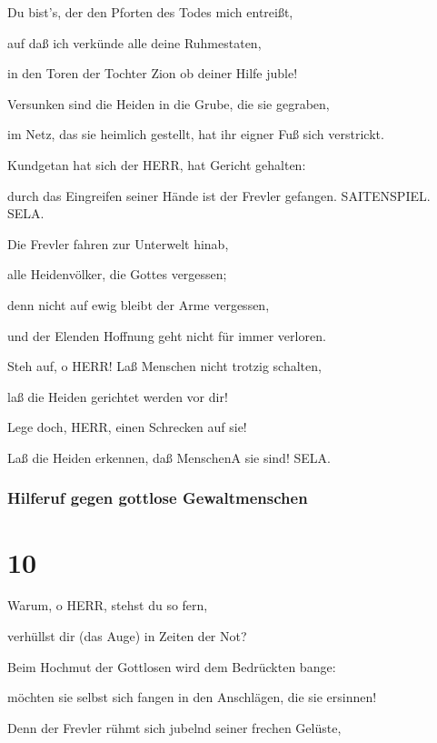 Du bist's, der den Pforten des Todes mich entreißt,

auf daß ich verkünde alle deine Ruhmestaten,

in den Toren der Tochter Zion ob deiner Hilfe juble!

Versunken sind die Heiden in die Grube, die sie gegraben,

im Netz, das sie heimlich gestellt, hat ihr eigner Fuß sich verstrickt.

Kundgetan hat sich der HERR, hat Gericht gehalten:

durch das Eingreifen seiner Hände ist der Frevler gefangen. SAITENSPIEL.
SELA.

Die Frevler fahren zur Unterwelt hinab,

alle Heidenvölker, die Gottes vergessen;

denn nicht auf ewig bleibt der Arme vergessen,

und der Elenden Hoffnung geht nicht für immer verloren.

Steh auf, o HERR! Laß Menschen nicht trotzig schalten,

laß die Heiden gerichtet werden vor dir!

Lege doch, HERR, einen Schrecken auf sie!

Laß die Heiden erkennen, daß Menschen{A} sie sind! SELA.

\hypertarget{hilferuf-gegen-gottlose-gewaltmenschen}{%
\subsubsection{Hilferuf gegen gottlose
Gewaltmenschen}\label{hilferuf-gegen-gottlose-gewaltmenschen}}

\hypertarget{section-9}{%
\section{10}\label{section-9}}

Warum, o HERR, stehst du so fern,

verhüllst dir (das Auge) in Zeiten der Not?

Beim Hochmut der Gottlosen wird dem Bedrückten bange:

möchten sie selbst sich fangen in den Anschlägen, die sie ersinnen!

Denn der Frevler rühmt sich jubelnd seiner frechen
Gelüste,

